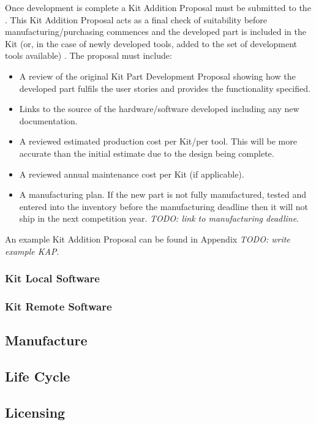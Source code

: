 \begin{draft}
Once development is complete a Kit Addition Proposal must be submitted to the . This Kit Addition Proposal acts as a final check of suitability before manufacturing/purchasing commences and the developed part is included in the Kit (or, in the case of newly developed tools, added to the set of development tools available) . The proposal must include:
\begin{itemize}
  \item A review of the original Kit Part Development Proposal showing how the developed part fulfils the user stories and provides the functionality specified.
  \item Links to the source of the hardware/software developed including any new documentation.
  \item A reviewed estimated production cost per Kit/per tool. This will be more accurate than the initial estimate due to the design being complete.
  \item A reviewed annual maintenance cost per Kit (if applicable).
  \item A manufacturing plan. If the new part is not fully manufactured, tested and entered into the inventory before the manufacturing deadline then it will not ship in the next competition year. \emph{TODO: link to manufacturing deadline}.
\end{itemize}

An example Kit Addition Proposal can be found in Appendix \emph{TODO: write example KAP}.

\subsubsection{Kit Local Software}
\subsubsection{Kit Remote Software}

\subsection{Manufacture}

\subsection{Life Cycle}

\subsection{Licensing}


\end{draft}
